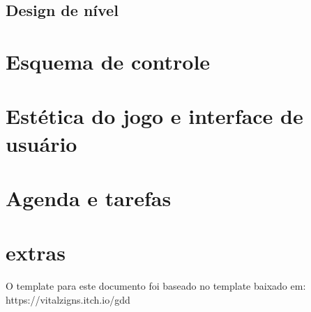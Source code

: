 \documentclass[12pt,a4paper]{article}
\begin{document}





\subsection{Design de nível}

\section{Esquema de controle}

\section{Estética do jogo e interface de usuário}

\section{Agenda e tarefas}

\section{extras}

O template para este documento foi baseado no template baixado em: https://vitalzigns.itch.io/gdd
\end{document}
